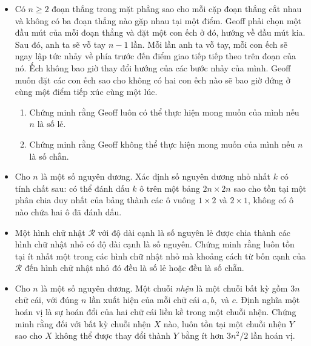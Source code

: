 \documentclass[11pt]{scrartcl}
\begin{document}
\begin{itemize}[label=, leftmargin=0em, itemsep=-0em]
    \item \begin{btvn}
        Có $n\ge 2$ đoạn thẳng trong mặt phẳng sao cho mỗi cặp đoạn thẳng cắt nhau và không có ba đoạn thẳng nào gặp nhau tại một điểm. Geoff phải chọn một đầu mút của mỗi đoạn thẳng và đặt một con ếch ở đó, hướng về đầu mút kia. Sau đó, anh ta sẽ vỗ tay $n-1$ lần. Mỗi lần anh ta vỗ tay, mỗi con ếch sẽ ngay lập tức nhảy về phía trước đến điểm giao tiếp tiếp theo trên đoạn của nó. Ếch không bao giờ thay đổi hướng của các bước nhảy của mình. Geoff muốn đặt các con ếch sao cho không có hai con ếch nào sẽ bao giờ đứng ở cùng một điểm tiếp xúc cùng một lúc.
        \begin{enumerate}[label=(\alph*)]
            \item Chứng minh rằng Geoff luôn có thể thực hiện mong muốn của mình nếu $n$ là số lẻ.
            \item Chứng minh rằng Geoff không thể thực hiện mong muốn của mình nếu $n$ là số chẵn.
        \end{enumerate}
    \end{btvn}

    \item \begin{btvn}
        Cho $n$ là một số nguyên dương. Xác định số nguyên dương nhỏ nhất $k$ có tính chất sau: có thể đánh dấu $k$ ô trên một bảng $2n \times 2n$ sao cho tồn tại một phân chia duy nhất của bảng thành các ô vuông $1 \times 2$ và $2 \times 1$, không có ô nào chứa hai ô đã đánh dấu.
    \end{btvn}

    \item \begin{btvn}
        Một hình chữ nhật $\mathcal{R}$ với độ dài cạnh là số nguyên lẻ được chia thành các hình chữ nhật nhỏ có độ dài cạnh là số nguyên. Chứng minh rằng luôn tồn tại ít nhất một trong các hình chữ nhật nhỏ mà khoảng cách từ bốn cạnh của $\mathcal{R}$ đến hình chữ nhật nhỏ đó đều là số lẻ hoặc đều là số chẵn.
    \end{btvn}

    \item \begin{btvn}
        Cho $n$ là một số nguyên dương. Một chuỗi \textit{nhện} là một chuỗi bất kỳ gồm $3n$ chữ cái, với đúng $n$ lần xuất hiện của mỗi chữ cái $a, b,$ và $c$. Định nghĩa một hoán vị là sự hoán đổi của hai chữ cái liền kề trong một chuỗi nhện. Chứng minh rằng đối với bất kỳ chuỗi nhện $X$ nào, luôn tồn tại một chuỗi nhện $Y$ sao cho $X$ không thể được thay đổi thành $Y$ bằng ít hơn $3n^2/2$ lần hoán vị.
    \end{btvn}


\end{itemize}
\end{document}
